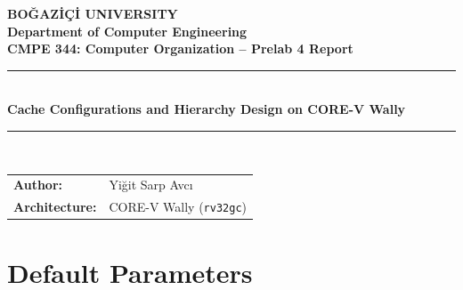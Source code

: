 \documentclass[11pt,a4paper]{article}
\begin{document}

\begin{center}
    {\Large \textbf{\textcolor{primaryblue}{BO\u{G}AZ\.{I}\c{C}\.{I} UNIVERSITY}}}\\[0.25em]
    {\normalsize \textbf{Department of Computer Engineering}}\\[0.32em]
    {\large \textbf{CMPE 344: Computer Organization -- Prelab 4 Report}}\\[0.45em]
    \rule{\textwidth}{0.8pt}\\[0.42em]
    {\Large \textbf{Cache Configurations and Hierarchy Design on CORE-V Wally}}\\[0.35em]
    \rule{\textwidth}{0.8pt}\\[0.4em]
\end{center}

{\renewcommand{\arraystretch}{1.28}
\noindent\begin{tabular}{@{}l l@{}}
    \textbf{Author:} & Yi\u{g}it Sarp Avc\i{} \\
    \textbf{Architecture:} & CORE-V Wally (\texttt{rv32gc}) \\
\end{tabular}}
\vspace{3pt}


\section{Default Parameters}
\end{document}
